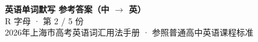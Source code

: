 \documentclass[10pt,a4paper]{article}
\begin{document}
\pagestyle{plain}

\begin{center}
{\LARGE\bfseries 英语单词默写 \quad 参考答案（中 $\to$ 英）}\\[0.22em]
{\large R 字母 · 第 2 / 5 份}\\[0.18em]
{\small 2026年上海市高考英语词汇用法手册 · 参照普通高中英语课程标准}
\end{center}

\vspace{0.2em}
\noindent{\color{rulegray}\rule{\textwidth}{0.8pt}}

\vspace{0.35em}

\vspace{0.25em}
\renewcommand{\arraystretch}{1.32}
\end{document}
